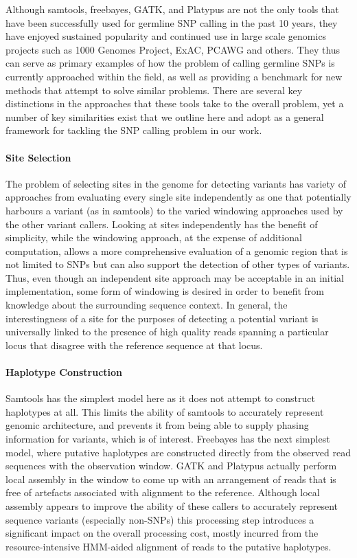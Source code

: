 Although samtools, freebayes, GATK, and Platypus are not the only tools that have been successfully used for germline SNP calling in the past 10 years, they have enjoyed sustained popularity and continued use in large scale genomics projects such as 1000 Genomes Project, ExAC\autocite{lek2016analysis}, PCAWG\autocite{stein2015data} and others. They thus can serve as primary examples of how the problem of calling germline SNPs is currently approached within the field, as well as providing a benchmark for new methods that attempt to solve similar problems. There are several key distinctions in the approaches that these tools take to the overall problem, yet a number of key similarities exist that we outline here and adopt as a general framework for tackling the SNP calling problem in our work.

\paragraph{Site Selection}

The problem of selecting sites in the genome for detecting variants has variety of approaches from evaluating every single site independently as one that potentially harbours a variant (as in samtools) to the varied windowing approaches used by the other variant callers. Looking at sites independently has the benefit of simplicity, while the windowing approach, at the expense of additional computation, allows a more comprehensive evaluation of a genomic region that is not limited to SNPs but can also support the detection of other types of variants. Thus, even though an independent site approach may be acceptable in an initial implementation, some form of windowing is desired in order to benefit from knowledge about the surrounding sequence context. In general, the interestingness of a site for the purposes of detecting a potential variant is universally linked to the presence of high quality reads spanning a particular locus that disagree with the reference sequence at that locus.

\paragraph{Haplotype Construction}

Samtools has the simplest model here as it does not attempt to construct haplotypes at all. This limits the ability of samtools to accurately represent genomic architecture, and prevents it from being able to supply phasing information for variants, which is of interest. Freebayes has the next simplest model, where putative haplotypes are constructed directly from the observed read sequences with the observation window. GATK and Platypus actually perform local assembly in the window to come up with an arrangement of reads that is free of artefacts\autocite{li2014towards} associated with alignment to the reference. Although local assembly appears to improve the ability of these callers to accurately represent sequence variants (especially non-SNPs) this processing step introduces a significant impact on the overall processing cost, mostly incurred from the resource-intensive HMM-aided alignment of reads to the putative haplotypes.


